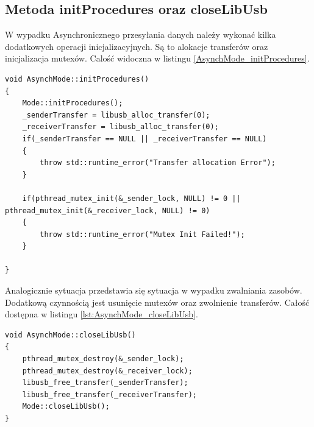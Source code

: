\documentclass{BscUS}
\begin{document}
\subsection{Metoda initProcedures oraz closeLibUsb}
W wypadku Asynchronicznego przesyłania danych należy wykonać kilka dodatkowych operacji inicjalizacyjnych. Są to alokacje transferów oraz inicjalizacja mutexów.
Calość widoczna w listingu \ref{AsynchMode_initProcedures}.
\begin{lstlisting}[caption={Metoda AsynchMode::initProcedures},label={lst:AsynchMode_initProcedures}]
void AsynchMode::initProcedures()
{
	Mode::initProcedures();
	_senderTransfer = libusb_alloc_transfer(0);	
	_receiverTransfer = libusb_alloc_transfer(0);
	if(_senderTransfer == NULL || _receiverTransfer == NULL)
	{
		throw std::runtime_error("Transfer allocation Error");
	}

	if(pthread_mutex_init(&_sender_lock, NULL) != 0 || pthread_mutex_init(&_receiver_lock, NULL) != 0)
	{
		throw std::runtime_error("Mutex Init Failed!");
	}

}
\end{lstlisting}
Analogicznie sytuacja przedstawia się sytuacja w wypadku zwalniania zasobów. Dodatkową czynnością jest usunięcie mutexów oraz zwolnienie transferów. Całość dostępna w listingu \ref{lst:AsynchMode_closeLibUsb}.
\begin{lstlisting}[caption={Metoda AsynchMode::closeLibUsb},label={lst:AsynchMode_closeLibUsb}]
void AsynchMode::closeLibUsb()
{
	pthread_mutex_destroy(&_sender_lock);
	pthread_mutex_destroy(&_receiver_lock);
	libusb_free_transfer(_senderTransfer);
	libusb_free_transfer(_receiverTransfer);
	Mode::closeLibUsb();
}
\end{lstlisting}
\end{document}
